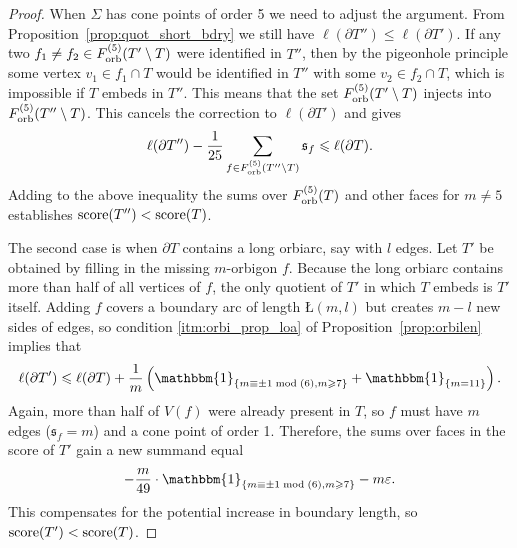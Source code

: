\documentclass{amsart}
\newcommand{\Forb}[1][m]{F^{(#1)}_{\textnormal{orb}}}
\newcommand{\tn}{\textnormal}
\begin{document}
\begin{proof}
When $\Sigma$ has cone points of order 5 we need to adjust the argument. From Proposition~\ref{prop:quot_short_bdry} we still have $\ell(\partial T'')\leqslant\ell(\partial T')$. If any two $f_1\neq f_2\in\Forb[5](T'\setminus T)$ were identified in $T''$, then by the pigeonhole principle some vertex $v_1\in f_1\cap T$ would be identified in $T''$ with some $v_2\in f_2\cap T$, which is impossible if $T$ embeds in $T''$. This means that the set $\Forb[5](T'\setminus T)$ injects into $\Forb[5](T''\setminus T)$. This cancels the correction to $\ell(\partial T')$ and gives
\begin{equation*}
\ell(\partial T'')-\frac{1}{25}\sum_{f\in\Forb[5](T''\setminus T)}\mathfrak{s}_f\leqslant\ell(\partial T).
\end{equation*}
Adding to the above inequality the sums over $\Forb[5](T)$ and other faces for $m\neq5$ establishes $\tn{score}(T'')<\tn{score}(T)$.

The second case is when $\partial T$ contains a long orbiarc, say with $l$ edges. Let $T'$ be obtained by filling in the missing $m$-orbigon $f$. Because the long orbiarc contains more than half of all vertices of $f$, the only quotient of $T'$ in which $T$ embeds is $T'$ itself. Adding $f$ covers a boundary arc of length $Ł(m,l)$ but creates $m-l$ new sides of edges, so condition \ref*{itm:orbi_prop_loa} of Proposition~\ref{prop:orbilen} implies that
\begin{equation*}
\ell(\partial T')\leqslant\ell(\partial T)+\frac{1}{m}\left(\mathbbm{1}_{\{m\equiv\pm1\bmod(6),m\geqslant7\}}+\mathbbm{1}_{\{m=11\}}\right).
\end{equation*}
Again, more than half of $V(f)$ were already present in $T$, so $f$ must have $m$ edges ($\mathfrak{s}_f=m$) and a cone point of order 1. Therefore, the sums over faces in the score of $T'$ gain a new summand equal
\begin{equation*}
-\frac{m}{49}\cdot\mathbbm{1}_{\{m\equiv\pm1\bmod(6),m\geqslant7\}}-m\varepsilon.
\end{equation*}
This compensates for the potential increase in boundary length, so $\tn{score}(T')<\tn{score}(T)$.
\end{proof}
\end{document}
